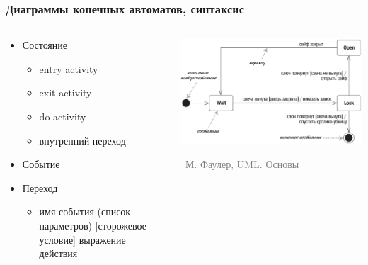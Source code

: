 \documentclass[xetex,mathserif,serif]{beamer}
\newcommand{\attribution}[1] {
	\vspace{-5mm}\begin{flushright}\begin{scriptsize}\textcolor{gray}{\textcopyright\, #1}\end{scriptsize}\end{flushright}
}
\begin{document}
	\begin{frame}
		\frametitle{Диаграммы конечных автоматов, синтаксис}
		\begin{columns}
			\begin{column}{0.5\textwidth}
				\begin{itemize}
					\item Состояние
					\begin{itemize}
						\item entry activity
						\item exit activity
						\item do activity
						\item внутренний переход
					\end{itemize}
					\item Событие
					\item Переход
					\begin{itemize}
						\item имя события (список параметров) [сторожевое условие] выражение действия
					\end{itemize}
				\end{itemize}
			\end{column}
			\begin{column}{0.5\textwidth}
				\begin{center}
					\includegraphics[width=\textwidth]{stateTransitionSyntax.png}
					\attribution{М. Фаулер, UML. Основы}
				\end{center}
			\end{column}
		\end{columns}
	\end{frame}
\end{document}
